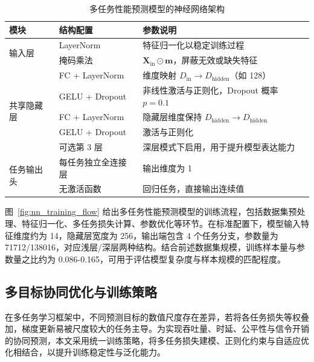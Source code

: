 \begin{table}[t]
	\centering
	\caption{多任务性能预测模型的神经网络架构}
	\label{tab:nn_architecture}
	\renewcommand{\arraystretch}{1.25}
	\begin{tabular}{lll}
		\toprule
		\textbf{模块} & \textbf{结构配置} & \textbf{参数说明} \\
		\midrule
		\multirow{2}{*}{输入层} 
		& LayerNorm 
		& 特征归一化以稳定训练过程 \\
		& 掩码乘法 
		& $\mathbf{X}_{\mathrm{in}} \odot \mathbf{m}$，屏蔽无效或缺失特征 \\
		\midrule
		\multirow{5}{*}{共享隐藏层} 
		& FC + LayerNorm 
		& 维度映射 $D_{\mathrm{in}} \rightarrow D_{\mathrm{hidden}}$（如 128） \\
		& GELU + Dropout 
		& 非线性激活与正则化，Dropout 概率 $p=0.1$ \\
		& FC + LayerNorm 
		& 隐藏层维度保持 $D_{\mathrm{hidden}} \rightarrow D_{\mathrm{hidden}}$ \\
		& GELU + Dropout 
		& 激活与正则化 \\
		& 可选第 3 层
		& 深层模式下启用，用于提升模型表达能力 \\
		\midrule
		\multirow{2}{*}{任务输出头} 
		& 每任务独立全连接层 
		& 输出维度为 1 \\
		& 无激活函数 
		& 回归任务，直接输出连续值 \\
		\bottomrule
	\end{tabular}
\end{table}



图~\ref{fig:nn_training_flow} 给出多任务性能预测模型的训练流程，包括数据集预处理、特征归一化、多任务损失计算、参数优化等环节。在标准配置下，模型输入特征维度约为 14，隐藏层宽度为 256，输出端包含 4 个任务分支，参数量为 71712/138016，对应浅层/深层两种结构。结合前述数据集规模，训练样本量与参数量之比约为 0.086-0.165，可用于评估模型复杂度与样本规模的匹配程度。

\subsection{多目标协同优化与训练策略}
\label{subsec:training}


在多任务学习框架中，不同预测目标的数值尺度存在差异，若将各任务损失等权叠加，梯度更新易被尺度较大的任务主导。为实现吞吐量、时延、公平性与信令开销的协同预测，本文采用统一训练策略，将多任务损失建模、正则化约束与自适应优化相结合，以提升训练稳定性与泛化能力。

